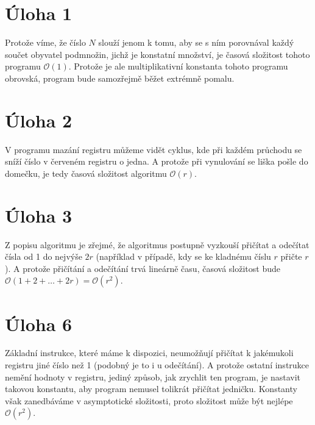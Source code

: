 \documentclass{fkssolpub}
\author{Ondřej Sedláček}
\begin{document}
\section{Úloha 1}

Protože víme, že číslo $N$ slouží jenom k tomu, aby se s ním porovnával každý součet obyvatel podmnožin, jichž je konstatní množství, je časová složitost tohoto programu $\mathcal{O}(1)$. Protože je ale multiplikativní konstanta tohoto programu obrovská, program bude samozřejmě běžet extrémně pomalu.

\section{Úloha 2}

V programu mazání registru můžeme vidět cyklus, kde při každém průchodu se sníží číslo v červeném registru o jedna. A protože při vynulování se liška pošle do domečku, je tedy časová složitost algoritmu $\mathcal{O}(r)$.

\section{Úloha 3}

Z popisu algoritmu je zřejmé, že algoritmus postupně vyzkouší přičítat a odečítat čísla od 1 do nejvýše $2r$ (například v případě, kdy se ke kladnému číslu $r$ přičte
$r$). A protože přičítání a odečítání trvá lineárně času, časová složitost bude
$\mathcal{O}(1 + 2 + \dots + 2r) = \mathcal{O}(r^2)$.

\section{Úloha 6}

Základní instrukce, které máme k dispozici, neumožňují přičítat k jakémukoli registru jiné číslo než 1 (podobný je to i u odečítání). A protože ostatní instrukce nemění hodnoty v registru, jediný způsob, jak zrychlit ten program, je nastavit takovou konstantu, aby program nemusel tolikrát přičítat jedničku. Konstanty však zanedbáváme v asymptotické složitosti, proto složitost může být nejlépe $\mathcal{O}(r^2)$.
\end{document}
